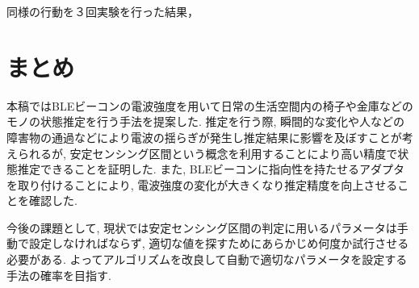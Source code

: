 \documentclass[Japanese]{dicomopapers}
\begin{document}
同様の行動を３回実験を行った結果，







\section{まとめ}
本稿ではBLEビーコンの電波強度を用いて日常の生活空間内の椅子や金庫などのモノの状態推定を行う手法を提案した.
推定を行う際, 瞬間的な変化や人などの障害物の通過などにより電波の揺らぎが発生し推定結果に影響を及ぼすことが考えられるが, 安定センシング区間という概念を利用することにより高い精度で状態推定できることを証明した.
また, BLEビーコンに指向性を持たせるアダプタを取り付けることにより, 電波強度の変化が大きくなり推定精度を向上させることを確認した.

今後の課題として, 現状では安定センシング区間の判定に用いるパラメータは手動で設定しなければならず, 適切な値を探すためにあらかじめ何度か試行させる必要がある.
よってアルゴリズムを改良して自動で適切なパラメータを設定する手法の確率を目指す.


\end{document}
